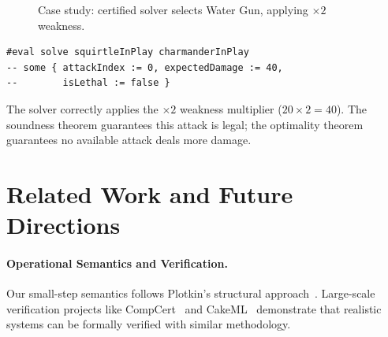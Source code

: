 \documentclass[a4paper,UKenglish,cleveref,autoref,anonymous]{lipics-v2021}
\begin{document}
\begin{figure}[t]
\centering
{}
\caption{Case study: certified solver selects Water Gun, applying $\times 2$ weakness.}
\label{fig:casestudy}
\end{figure}

\begin{lstlisting}[basicstyle=\ttfamily\small,columns=flexible]
#eval solve squirtleInPlay charmanderInPlay
-- some { attackIndex := 0, expectedDamage := 40, 
--        isLethal := false }
\end{lstlisting}

The solver correctly applies the $\times 2$ weakness multiplier ($20 \times 2 = 40$).
The soundness theorem guarantees this attack is legal; the optimality theorem guarantees no available attack deals more damage.

\section{Related Work and Future Directions}
\label{sec:related}

\paragraph{Operational Semantics and Verification.}
Our small-step semantics follows Plotkin's structural approach~\cite{Plotkin2004}.
Large-scale verification projects like CompCert~\cite{Leroy2009} and CakeML~\cite{DBLP:journals/jar/KumarHMN16} demonstrate that realistic systems can be formally verified with similar methodology.
\end{document}
